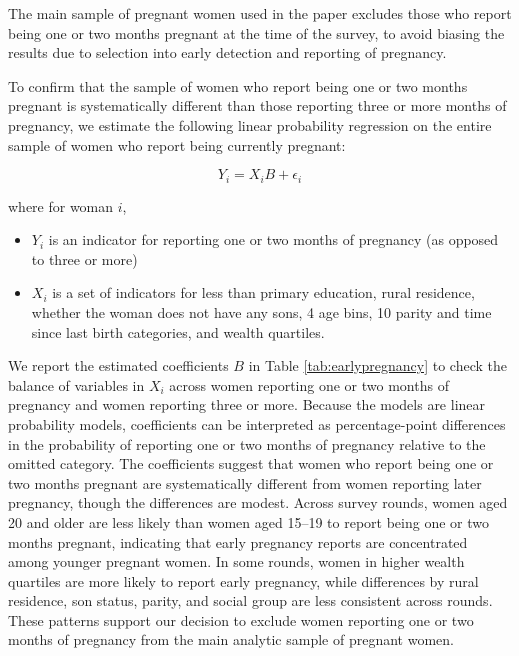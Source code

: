 \documentclass[10pt,twoside,reqno]{article}
\begin{document}
The main sample of pregnant women used in the paper excludes those who report being one or two months pregnant at the time of the survey, 
to avoid biasing the results due to selection into early detection and reporting of pregnancy.

To confirm that the sample of women who report being one or two months pregnant is systematically different than those reporting three or more months of 
pregnancy, we estimate the following linear probability regression on the entire sample of women who report being currently pregnant:

\begin{equation}
Y_i=X_i B+\epsilon_i
\end{equation}

where for woman $i$, 
\begin{itemize}
    \item $Y_i$ is an indicator for reporting one or two months of pregnancy (as opposed to three or more)
    \item $X_i$ is a set of indicators for less than primary education, rural residence, whether the woman does not have any sons, 4 age bins, 10 parity and time since last birth categories, and wealth quartiles. 
\end{itemize}

We report the estimated coefficients $B$ in Table \ref{tab:earlypregnancy} to check the balance of variables in $X_i$ across women reporting one or two months of pregnancy and women reporting three or more. Because the models are linear probability models, coefficients can be interpreted as percentage-point differences in the probability of reporting one or two months of pregnancy relative to the omitted category. The coefficients suggest that women who report being one or two months pregnant are systematically different from women reporting later pregnancy, though the differences are modest. Across survey rounds, women aged 20 and older are less likely than women aged 15--19 to report being one or two months pregnant, indicating that early pregnancy reports are concentrated among younger pregnant women. In some rounds, women in higher wealth quartiles are more likely to report early pregnancy, while differences by rural residence, son status, parity, and social group are less consistent across rounds. These patterns support our decision to exclude women reporting one or two months of pregnancy from the main analytic sample of pregnant women.
\end{document}
